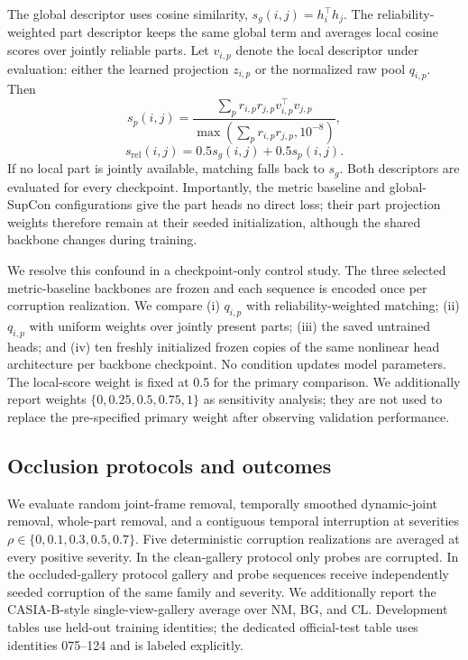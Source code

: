 \documentclass[runningheads]{llncs}
\begin{document}
The global descriptor uses cosine similarity,
$s_g(i,j)=h_i^\top h_j$. The reliability-weighted part descriptor keeps the
same global term and averages local cosine scores over jointly reliable parts.
Let $v_{i,p}$ denote the local descriptor under evaluation: either the learned
projection $z_{i,p}$ or the normalized raw pool $q_{i,p}$. Then
\begin{equation}
 s_p(i,j)=
 \frac{\sum_p r_{i,p}r_{j,p}v_{i,p}^{\top}v_{j,p}}
 {\max(\sum_p r_{i,p}r_{j,p},10^{-8})},
\end{equation}
\begin{equation}
 s_{\mathrm{rel}}(i,j)=0.5s_g(i,j)+0.5s_p(i,j).
 \label{eq:matching}
\end{equation}
If no local part is jointly available, matching falls back to $s_g$. Both
descriptors are evaluated for every checkpoint. Importantly, the metric
baseline and global-SupCon configurations give the part heads no direct loss;
their part projection weights therefore remain at their seeded initialization,
although the shared backbone changes during training.

We resolve this confound in a checkpoint-only control study. The three selected
metric-baseline backbones are frozen and each sequence is encoded once per
corruption realization. We compare (i) $q_{i,p}$ with reliability-weighted
matching; (ii) $q_{i,p}$ with uniform weights over jointly present parts; (iii)
the saved untrained heads; and (iv) ten freshly initialized frozen copies of
the same nonlinear head architecture per backbone checkpoint. No condition
updates model parameters. The local-score weight is fixed at 0.5 for the
primary comparison. We additionally report weights
$\{0,0.25,0.5,0.75,1\}$ as sensitivity analysis; they are not used to replace
the pre-specified primary weight after observing validation performance.

\subsection{Occlusion protocols and outcomes}

We evaluate random joint-frame removal, temporally smoothed dynamic-joint
removal, whole-part removal, and a contiguous temporal interruption at
severities $\rho\in\{0,0.1,0.3,0.5,0.7\}$. Five deterministic corruption
realizations are averaged at every positive severity. In the clean-gallery
protocol only probes are corrupted. In the occluded-gallery protocol gallery
and probe sequences receive independently seeded corruption of the same family
and severity. We additionally report the CASIA-B-style single-view-gallery
average over NM, BG, and CL. Development tables use held-out training
identities; the dedicated official-test table uses identities 075--124 and is
labeled explicitly.
\end{document}
